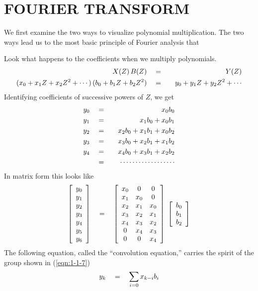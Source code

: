 \section{FOURIER TRANSFORM}
We first examine the two ways to visualize polynomial multiplication.
The two ways lead us to the most basic principle of Fourier analysis
that
\par
{}
\par\noindent
Look what happens to the coefficients when we multiply polynomials.
\begin{eqnarray}
X(Z)\, B(Z) &\quad =\quad & Y(Z) \label{eqn:1-1-5} \\
(x_0 + x_1 Z + x_2 Z^2 + \cdots )\, (b_0 + b_1 Z + b_2 Z^2) &\quad =\quad &
y_0 + y_1 Z + y_2 Z^2 + \cdots  \label{eqn:1-1-6}
\end{eqnarray}
Identifying coefficients of successive powers of $Z$, we get
\begin{eqnarray}
y_0 &\quad =\quad & x_0 b_0 \nonumber \\
y_1 &\quad =\quad & x_1 b_0  + x_0 b_1 \nonumber \\
y_2 &\quad =\quad & x_2 b_0 + x_1 b_1 + x_0 b_2 \label{eqn:1-1-7} \\
y_3 &\quad =\quad & x_3 b_0 + x_2 b_1 + x_1 b_2 \nonumber \\
y_4 &\quad =\quad & x_4 b_0 + x_3 b_1 + x_2 b_2 \nonumber \\
    &\quad =\quad & \cdots\cdots\cdots\cdots\cdots\cdots  \nonumber
\end{eqnarray}
In matrix form this looks like
\begin{equation}
\left[ 
\begin{array}{c}
  y_0 \\ 
  y_1 \\ 
  y_2 \\ 
  y_3 \\ 
  y_4 \\ 
  y_5 \\ 
  y_6
  \end{array} \right] 
\quad =\quad
\left[ 
\begin{array}{ccc}
  x_0 & 0   & 0    \\
  x_1 & x_0 & 0    \\
  x_2 & x_1 & x_0  \\
  x_3 & x_2 & x_1  \\
  x_4 & x_3 & x_2  \\
  0   & x_4 & x_3  \\
  0   & 0   & x_4
  \end{array} \right] 
\; \left[ 
\begin{array}{c}
  b_0 \\ 
  b_1 \\ 
  b_2 \end{array} \right]
\label{eqn:contran2}
\end{equation}
The following equation, called the
``convolution equation,''
carries the spirit of the group shown in (\ref{eqn:1-1-7})
\begin{equation}
y_k \quad =\quad  \sum_{i = 0} x_{k - i} b_i
\label{eqn:conv}
\end{equation}


